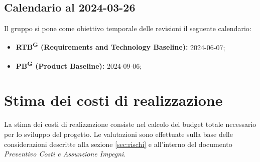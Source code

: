 \documentclass[8pt]{article}
\newcommand{\glossterm}[1]{#1\textsuperscript{G}} %
\begin{document}
\subsection{Calendario al 2024-03-26} 
Il gruppo si pone come obiettivo temporale delle revisioni il seguente calendario:
\begin{itemize}
    \item \textbf{\glossterm{RTB} (Requirements and Technology Baseline):} 2024-06-07;
    \item \textbf{\glossterm{PB} (Product Baseline):} 2024-09-06;
\end{itemize}
\section{Stima dei costi di realizzazione} \label{sec:cost}
La stima dei costi di realizzazione consiste nel calcolo del budget totale necessario per lo sviluppo del progetto. Le valutazioni sono effettuate sulla base delle considerazioni descritte alla sezione \ref{sec:rischi} e all'interno del documento \textit{Preventivo Costi e Assunzione Impegni}.
\end{document}
